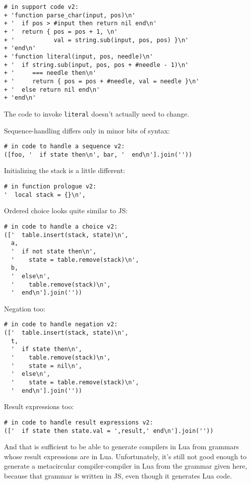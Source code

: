 \documentclass[
]{article}
\begin{document}
\begin{verbatim}
# in support code v2:
+ 'function parse_char(input, pos)\n'
+ '  if pos > #input then return nil end\n'
+ '  return { pos = pos + 1, \n'
+ '           val = string.sub(input, pos, pos) }\n'
+ 'end\n'
+ 'function literal(input, pos, needle)\n'
+ '  if string.sub(input, pos, pos + #needle - 1)\n'
+ '     === needle then\n'
+ '     return { pos = pos + #needle, val = needle }\n'
+ '  else return nil end\n'
+ 'end\n'
\end{verbatim}

The code to invoke \texttt{literal} doesn't actually need to change.

Sequence-handling differs only in minor bits of syntax:

\begin{verbatim}
# in code to handle a sequence v2:
([foo, '  if state then\n', bar, '  end\n'].join(''))
\end{verbatim}

Initializing the stack is a little different:

\begin{verbatim}
# in function prologue v2:
'  local stack = {}\n',
\end{verbatim}

Ordered choice looks quite similar to JS:

\begin{verbatim}
# in code to handle a choice v2:
(['  table.insert(stack, state)\n',
  a,
  '  if not state then\n',
  '    state = table.remove(stack)\n',
  b,
  '  else\n',
  '    table.remove(stack)\n',
  '  end\n'].join(''))
\end{verbatim}

Negation too:

\begin{verbatim}
# in code to handle negation v2:
(['  table.insert(stack, state)\n',
  t,
  '  if state then\n',
  '    table.remove(stack)\n',
  '    state = nil\n',
  '  else\n',
  '    state = table.remove(stack)\n',
  '  end\n'].join(''))
\end{verbatim}

Result expressions too:

\begin{verbatim}
# in code to handle result expressions v2:
(['  if state then state.val = ',result,' end\n'].join(''))
\end{verbatim}

And that is sufficient to be able to generate compilers in Lua from
grammars whose result expressions are in Lua. Unfortunately, it's still
not good enough to generate a metacircular compiler-compiler in Lua from
the grammar given here, because that grammar is written in JS, even
though it generates Lua code.
\end{document}
